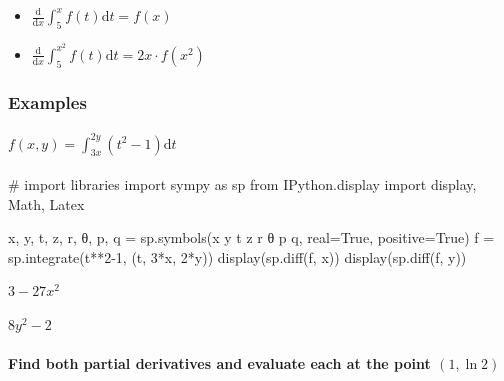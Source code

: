\documentclass[
  letterpaper,
  DIV=11,
  numbers=noendperiod]{scrartcl}
\let\oldparagraph\paragraph
\renewcommand{\paragraph}[1]{\oldparagraph{#1}\mbox{}}
\newenvironment{Shaded}{\begin{snugshade}}{\end{snugshade}}
\newcommand{\CommentTok}[1]{\textcolor[rgb]{0.37,0.37,0.37}{#1}}
\newcommand{\DecValTok}[1]{\textcolor[rgb]{0.68,0.00,0.00}{#1}}
\newcommand{\ImportTok}[1]{\textcolor[rgb]{0.00,0.46,0.62}{#1}}
\newcommand{\NormalTok}[1]{\textcolor[rgb]{0.00,0.23,0.31}{#1}}
\newcommand{\OperatorTok}[1]{\textcolor[rgb]{0.37,0.37,0.37}{#1}}
\newcommand{\StringTok}[1]{\textcolor[rgb]{0.13,0.47,0.30}{#1}}
\newcommand{\VariableTok}[1]{\textcolor[rgb]{0.07,0.07,0.07}{#1}}
\providecommand{\tightlist}{%
  \setlength{\itemsep}{0pt}\setlength{\parskip}{0pt}}\usepackage{longtable,booktabs,array}
\begin{document}
\begin{itemize}
\tightlist
\item
  \(\frac{\mathrm{d}}{\mathrm{d}x}\int_5^x f(t) \mathrm{d}t = f(x)\)
\item
  \(\frac{\mathrm{d}}{\mathrm{d}x}\int_5^{x^2} f(t) \mathrm{d}t = 2x \cdot f(x^2)\)
\end{itemize}

\hypertarget{examples-5}{%
\subsubsection{Examples}\label{examples-5}}

\hypertarget{fxy-int_3x2yt2-1mathrmdt}{%
\paragraph{\texorpdfstring{\(f(x,y) = \int_{3x}^{2y}(t^2-1)\mathrm{d}t\)}{f(x,y) = \textbackslash int\_\{3x\}\^{}\{2y\}(t\^{}2-1)\textbackslash mathrm\{d\}t}}\label{fxy-int_3x2yt2-1mathrmdt}}

\begin{Shaded}
\begin{Highlighting}[numbers=left,,]
\CommentTok{\# import libraries}
\ImportTok{import}\NormalTok{ sympy }\ImportTok{as}\NormalTok{ sp}
\ImportTok{from}\NormalTok{ IPython.display }\ImportTok{import}\NormalTok{ display, Math, Latex}
\end{Highlighting}
\end{Shaded}

\begin{Shaded}
\begin{Highlighting}[numbers=left,,]
\NormalTok{x, y, t, z, r, θ, p, q }\OperatorTok{=}\NormalTok{ sp.symbols(}\StringTok{\textquotesingle{}x y t z r θ p q\textquotesingle{}}\NormalTok{, real}\OperatorTok{=}\VariableTok{True}\NormalTok{, positive}\OperatorTok{=}\VariableTok{True}\NormalTok{)}
\NormalTok{f }\OperatorTok{=}\NormalTok{ sp.integrate(t}\OperatorTok{**}\DecValTok{2}\OperatorTok{{-}}\DecValTok{1}\NormalTok{, (t, }\DecValTok{3}\OperatorTok{*}\NormalTok{x, }\DecValTok{2}\OperatorTok{*}\NormalTok{y))}
\NormalTok{display(sp.diff(f, x))}
\NormalTok{display(sp.diff(f, y))}
\end{Highlighting}
\end{Shaded}

$\displaystyle 3 - 27 x^{2}$

$\displaystyle 8 y^{2} - 2$

\hypertarget{find-both-partial-derivatives-and-evaluate-each-at-the-point-1-ln-2}{%
\paragraph{\texorpdfstring{Find both partial derivatives and evaluate
each at the point
\((1, \ln 2)\)}{Find both partial derivatives and evaluate each at the point (1, \textbackslash ln 2)}}\label{find-both-partial-derivatives-and-evaluate-each-at-the-point-1-ln-2}}
\end{document}
